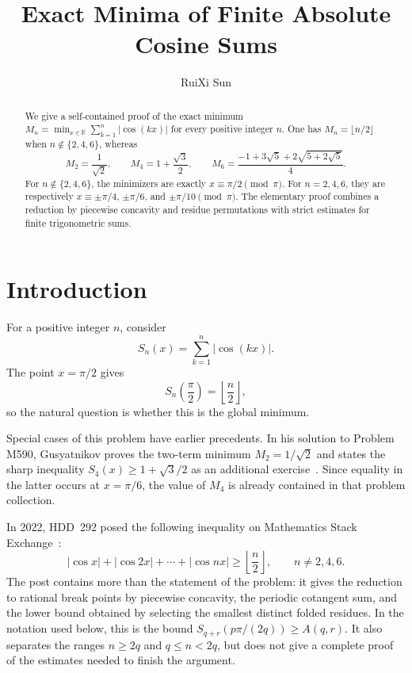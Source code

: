 \documentclass[11pt]{article}
\title{Exact Minima of Finite Absolute Cosine Sums}
\author{RuiXi Sun}
\date{}
\begin{document}
\maketitle

\begin{abstract}
We give a self-contained proof of the exact minimum
\(M_n=\min_{x\in\mathbb R}\sum_{k=1}^n |\cos(kx)|\) for every positive
integer \(n\). One has \(M_n=\lfloor n/2\rfloor\) when
\(n\notin\{2,4,6\}\), whereas
\[
M_2=\frac1{\sqrt2},\qquad
M_4=1+\frac{\sqrt3}{2},\qquad
M_6=
\frac{-1+3\sqrt5+2\sqrt{5+2\sqrt5}}4.
\]
For \(n\notin\{2,4,6\}\), the minimizers are exactly
\(x\equiv\pi/2\pmod\pi\). For \(n=2,4,6\), they are respectively
\(x\equiv\pm\pi/4\), \(\pm\pi/6\), and \(\pm\pi/10\pmod\pi\).
The elementary proof combines a reduction by piecewise concavity and
residue permutations with strict estimates for finite trigonometric sums.
\end{abstract}

\section{Introduction}

For a positive integer \(n\), consider
\[
        S_n(x)=\sum_{k=1}^n |\cos(kx)|.
\]
The point \(x=\pi/2\) gives
\[
        S_n\!\left(\frac{\pi}{2}\right)
        =\left\lfloor \frac n2\right\rfloor,
\]
so the natural question is whether this is the global minimum.

Special cases of this problem have earlier precedents. In his solution to
Problem M590, Gusyatnikov proves the two-term minimum \(M_2=1/\sqrt2\)
and states the sharp inequality \(S_4(x)\ge1+\sqrt3/2\) as an additional
exercise~\cite{Gusyatnikov1980}. Since equality in the latter occurs at
\(x=\pi/6\), the value of \(M_4\) is already contained in that problem
collection.

In 2022, HDD~292 posed the following inequality on
Mathematics Stack Exchange~\cite{MSE2022}:
\[
        |\cos x|+|\cos 2x|+\cdots+|\cos nx|
        \ge \left\lfloor\frac n2\right\rfloor,
        \qquad n\neq 2,4,6.
\]
The post contains more than the statement of the problem: it gives the
reduction to rational break points by piecewise concavity, the periodic
cotangent sum, and the lower bound obtained by selecting the smallest
distinct folded residues. In the notation used below, this is the bound
\(S_{q+r}(p\pi/(2q))\ge A(q,r)\). It also separates the ranges
\(n\ge2q\) and \(q\le n<2q\), but does not give a complete proof of
the estimates needed to finish the argument.
\end{document}
